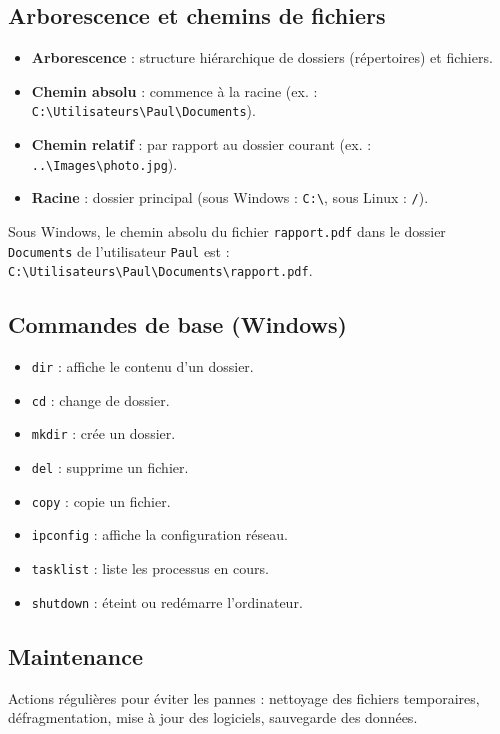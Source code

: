 \subsection{Arborescence et chemins de fichiers}
\begin{itemize}
    \item \textbf{Arborescence} : structure hiérarchique de dossiers (répertoires) et fichiers.
    \item \textbf{Chemin absolu} : commence à la racine (ex. : \texttt{C:\textbackslash Utilisateurs\textbackslash Paul\textbackslash Documents}).
    \item \textbf{Chemin relatif} : par rapport au dossier courant (ex. : \texttt{..\textbackslash Images\textbackslash photo.jpg}).
    \item \textbf{Racine} : dossier principal (sous Windows : \texttt{C:\textbackslash}, sous Linux : \texttt{/}).
\end{itemize}

\begin{exemple}
Sous Windows, le chemin absolu du fichier \texttt{rapport.pdf} dans le dossier \texttt{Documents} de l'utilisateur \texttt{Paul} est : \texttt{C:\textbackslash Utilisateurs\textbackslash Paul\textbackslash Documents\textbackslash rapport.pdf}.
\end{exemple}

\subsection{Commandes de base (Windows)}
\begin{itemize}
    \item \texttt{dir} : affiche le contenu d'un dossier.
    \item \texttt{cd} : change de dossier.
    \item \texttt{mkdir} : crée un dossier.
    \item \texttt{del} : supprime un fichier.
    \item \texttt{copy} : copie un fichier.
    \item \texttt{ipconfig} : affiche la configuration réseau.
    \item \texttt{tasklist} : liste les processus en cours.
    \item \texttt{shutdown} : éteint ou redémarre l'ordinateur.
\end{itemize}

\subsection{Maintenance}
\begin{definition}
Actions régulières pour éviter les pannes : nettoyage des fichiers temporaires, défragmentation, mise à jour des logiciels, sauvegarde des données.
\end{definition}


